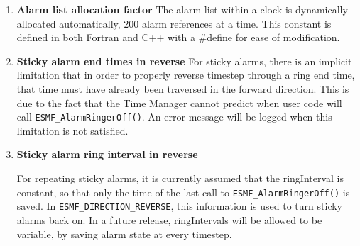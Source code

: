 
\begin{enumerate}

\item {\bf Alarm list allocation factor}  The alarm list within a clock is
dynamically allocated automatically, 200 alarm references at a time.
This constant is defined in both Fortran and C++ with a \#define for ease
of modification.

\item {\bf Sticky alarm end times in reverse}  For sticky alarms, there is
an implicit limitation that in order to properly reverse timestep through a
ring end time, that time must have already been traversed in the forward
direction.  This is due to the fact that the Time Manager cannot predict
when user code will call {\tt ESMF\_AlarmRingerOff()}.  An error message
will be logged when this limitation is not satisfied.

\item {\bf Sticky alarm ring interval in reverse}  
\begin{sloppypar}
For repeating sticky alarms,
it is currently assumed that the ringInterval is constant, so that only the
time of the last call to {\tt ESMF\_AlarmRingerOff()} is saved.  In
{\tt ESMF\_DIRECTION\_REVERSE}, this information is used to turn sticky alarms
back on.  In a future release, ringIntervals will be allowed to be variable,
by saving alarm state at every timestep.
\end{sloppypar}

\end{enumerate}
